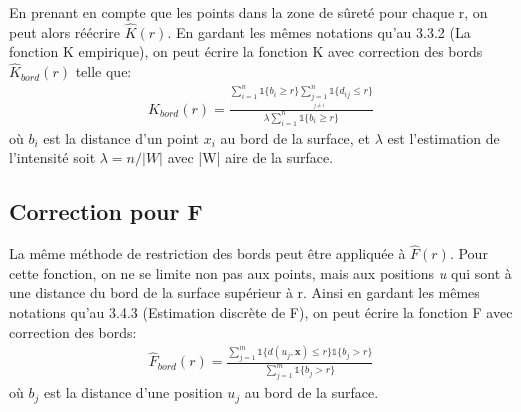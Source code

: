 \documentclass[stage2a]{tnreport}
\begin{document}
En prenant en compte que les points dans la zone de sûreté pour chaque r, on peut alors réécrire \begin{math} \hat{K}(r) \end{math}. En gardant les mêmes notations qu'au 3.3.2 (La fonction K empirique), on peut écrire la fonction K avec correction des bords \begin{math} \hat{K}_{bord}(r) \end{math} telle que:
\begin{align*}
\hat{K}_{bord}(r) = \frac{  \sum_{i=1}^n \mathds{1} \{b_i \geq r \} \sum_{\underset{j \neq i}{j=1}}^n \mathds{1} \{d_{ij} \leq r \}}{\lambda \sum_{i=1}^n \mathds{1} \{b_i \geq r \}}
\end{align*}
où \begin{math}b_i\end{math} est la distance d'un point \begin{math}x_i\end{math} au bord de la surface, et \begin{math}\lambda\end{math} est l'estimation de l'intensité soit \begin{math}\lambda = n/|W|\end{math} avec |W| aire de la surface.


\subsection{Correction pour F}

La même méthode de restriction des bords peut être appliquée à \begin{math} \hat{F}(r) \end{math}. Pour cette fonction, on ne se limite non pas aux points, mais aux positions \textit{u} qui sont à une distance du bord de la surface supérieur à r. Ainsi en gardant les mêmes notations qu'au 3.4.3 (Estimation discrète de F), on peut écrire la fonction F avec correction des bords:
\begin{align*}
\hat{F}_{bord}(r) = \frac{  \sum_{j=1}^m \mathds{1} \{d(u_j,\textbf{x}) \leq r \} \mathds{1} \{b_j > r \} }{ \sum_{j=1}^m \mathds{1} \{b_j > r \}}
\end{align*}
où \begin{math}b_j\end{math} est la distance d'une position \begin{math}u_j\end{math} au bord de la surface.
\end{document}
